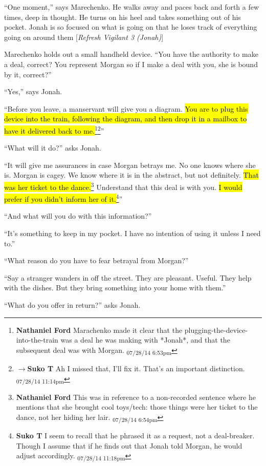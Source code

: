 ``One moment,'' says Marechenko. He walks away and paces back and forth a few times, deep in thought.  He turns on his heel and takes something out of his pocket.  Jonah is so focused on what is going on that he loses track of everything going on around them {[}\textit{Refresh Vigilant 3 (Jonah)}{]}

Marechenko holds out a small handheld device.  ``You have the authority to make a deal, correct?  You represent Morgan so if I make a deal with you, she is bound by it, correct?''

``Yes,'' says Jonah.

``Before you leave, a manservant will give you a diagram.  \hl{You are to plug this device into the train, following the diagram, and then drop it in a mailbox to have it delivered back to me.}\footnote{\textbf{Nathaniel Ford }Marachenko made it clear that the plugging-the-device-into-the-train was a deal he was making with *Jonah*, and that the subsequent deal was with Morgan. \textsubscript{07/28/14 6:53pm}}\footnote{$\rightarrow$\textbf{Suko T }Ah I missed that, I'll fix it.  That's an important distinction. \textsubscript{07/28/14 11:14pm}}''

``What will it do?'' asks Jonah.

``It will give me assurances in case Morgan betrays me.  No one knows where she is.  Morgan is cagey.  We know where it is in the abstract, but not definitely.  \hl{That was her ticket to the dance.}\footnote{\textbf{Nathaniel Ford }This was in reference to a non-recorded sentence where he mentions that she brought cool toys/tech: those things were her ticket to the dance, not her hiding her lair. \textsubscript{07/28/14 6:54pm}}  Understand that this deal is with you.  \hl{I would prefer if you didn't inform her of it.}\footnote{\textbf{Suko T }I seem to recall that he phrased it as a request, not a deal-breaker.  Though I assume that if he finds out that Jonah told Morgan, he would adjust accordingly. \textsubscript{07/28/14 11:18pm}}''

``And what will you do with this information?''

``It's something to keep in my pocket.  I have no intention of using it unless I need to.''

``What reason do you have to fear betrayal from Morgan?''

``Say a stranger wanders in off the street.  They are pleasant.  Useful.  They help with the dishes. But they bring something into your home with them.''

``What do you offer in return?'' asks Jonah.

